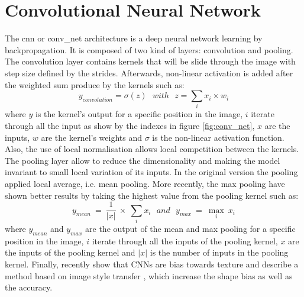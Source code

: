 \documentclass[11pt]{report}
\begin{document}
\section{Convolutional Neural Network}

The \acrshort{cnn} or \acrshort{conv_net} architecture \cite{NIPS1989_293} is a deep neural network learning by backpropagation. It is composed of two kind of layers: convolution and pooling. The convolution layer contains kernels that will be slide through the image with step size defined by the strides. Afterwards, non-linear activation is added after the weighted sum produce by the kernels \cite{5537907} such as:
\begin{equation}
y_{convolution} = \sigma(z)\ \ \ with\ \ \ z = \sum_{i} x_i \times w_i
\end{equation}
where $y$ is the kernel's output for a specific position in the image, $i$ iterate through all the input as show by the indexes in figure \ref{fig:conv_net}, $x$ are the inputs, $w$ are the kernel's weights and $\sigma$ is the non-linear activation function. Also, the use of local normalisation allows local competition between the kernels. The pooling layer allow to reduce the dimensionality and making the model invariant to small local variation of its inputs. In the original version \textcite{NIPS1989_293} the pooling applied local average, i.e. mean pooling. More recently, the max pooling have shown better results \cite{10.1007/978-3-642-15825-4_10} by taking the highest value from the pooling kernel such as:
\begin{equation}
y_{mean}\ =\ \frac{1}{|x|}\ \times\ \sum_{i} x_i\ \ \ and\ \ \ y_{max}\ =\ \max_{i}\ x_i
\end{equation}
where $y_{mean}$ and $y_{max}$ are the output of the mean and max pooling for a specific position in the image, $i$ iterate through all the inputs of the pooling kernel, $x$ are the inputs of the pooling kernel and $|x|$ is the number of inputs in the pooling kernel. Finally, \textcite{DBLP:journals/corr/abs-1811-12231} recently show that CNNs are bias towards texture and describe a method based on image style transfer \cite{Gatys_2016_CVPR}, which increase the shape bias as well as the accuracy.
\end{document}
